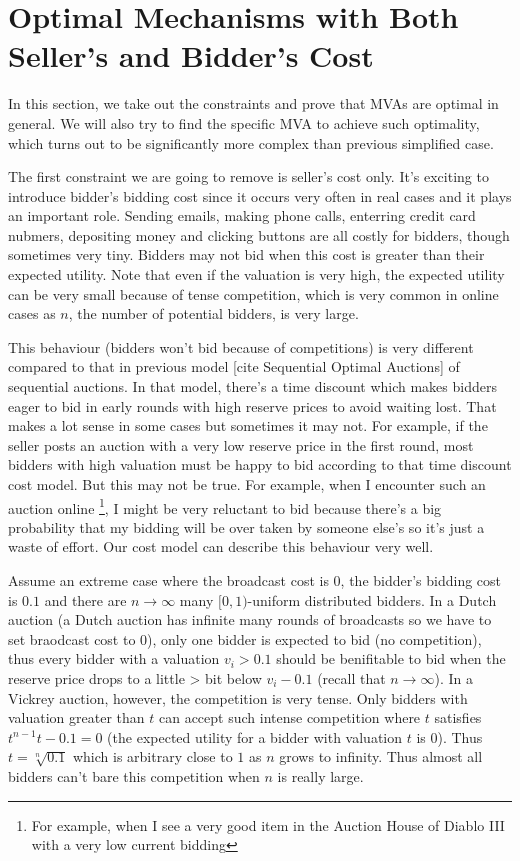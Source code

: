 \section{Optimal Mechanisms with Both Seller's and Bidder's Cost}

In this section, we take out the constraints and prove that MVAs are optimal in
general. We will also try to find the specific MVA to achieve such optimality,
which turns out to be significantly more complex than previous
simplified case.

The first constraint we are going to remove is seller's cost only.  It's
exciting to introduce bidder's bidding cost since it occurs very often in real
cases and it plays an important role.  Sending emails, making phone calls,
enterring credit card nubmers, depositing money and clicking buttons are all
costly for bidders, though sometimes very tiny.  Bidders may not bid when this
cost is greater than their expected utility. Note that even if the valuation is
very high, the expected utility can be very small because of tense competition,
which is very common in online cases as $n$, the number of potential bidders,
is very large. 

This behaviour (bidders won't bid because of competitions) is very different
compared to that in previous model [cite Sequential Optimal Auctions] of
sequential auctions. In that model, there's a time discount which
makes bidders eager to bid in early rounds with high reserve prices to avoid
waiting lost. That makes a lot sense in some cases but sometimes it may not.
For example, if the seller posts an auction with a very low reserve price in
the first round, most bidders with high valuation must be happy to bid
according to that time discount cost model. But this may not be true. For
example, when I encounter such an auction online \footnote{For example, when I
see a very good item in the Auction House of Diablo III with a very low current
bidding}, I might be very reluctant to bid because there's a big probability
that my bidding will be over taken by someone else's so it's just a waste of
effort. Our cost model can describe this behaviour very well.

Assume an extreme case where the broadcast cost is $0$, the bidder's bidding
cost is $0.1$ and there are $n \rightarrow \infty$ many $[0, 1)$-uniform
distributed bidders. In a Dutch auction (a Dutch auction has infinite many
rounds of broadcasts so we have to set braodcast cost to $0$), only one bidder
is expected to bid (no competition), thus every bidder with a valuation $v_i
> 0.1$ should be benifitable to bid when the reserve price drops to a little
> bit below
$v_i-0.1$ (recall that $n \rightarrow \infty$).  In a Vickrey auction, however,
the competition is very tense. Only bidders with valuation greater than $t$ can
accept such intense competition where $t$ satisfies $t^{n-1}t - 0.1 = 0$ (the
expected utility for a bidder with valuation $t$ is $0$).  Thus $t =
\sqrt[n]{0.1}$ which is arbitrary close to $1$ as $n$ grows to infinity.  Thus
almost all bidders can't bare this competition when $n$ is really large.

